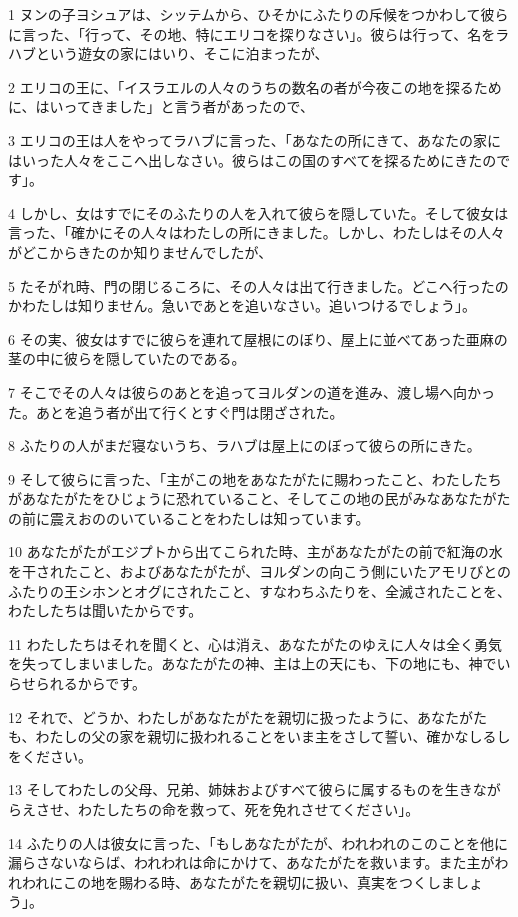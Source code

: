 \par 1 ヌンの子ヨシュアは、シッテムから、ひそかにふたりの斥候をつかわして彼らに言った、「行って、その地、特にエリコを探りなさい」。彼らは行って、名をラハブという遊女の家にはいり、そこに泊まったが、
\par 2 エリコの王に、「イスラエルの人々のうちの数名の者が今夜この地を探るために、はいってきました」と言う者があったので、
\par 3 エリコの王は人をやってラハブに言った、「あなたの所にきて、あなたの家にはいった人々をここへ出しなさい。彼らはこの国のすべてを探るためにきたのです」。
\par 4 しかし、女はすでにそのふたりの人を入れて彼らを隠していた。そして彼女は言った、「確かにその人々はわたしの所にきました。しかし、わたしはその人々がどこからきたのか知りませんでしたが、
\par 5 たそがれ時、門の閉じるころに、その人々は出て行きました。どこへ行ったのかわたしは知りません。急いであとを追いなさい。追いつけるでしょう」。
\par 6 その実、彼女はすでに彼らを連れて屋根にのぼり、屋上に並べてあった亜麻の茎の中に彼らを隠していたのである。
\par 7 そこでその人々は彼らのあとを追ってヨルダンの道を進み、渡し場へ向かった。あとを追う者が出て行くとすぐ門は閉ざされた。
\par 8 ふたりの人がまだ寝ないうち、ラハブは屋上にのぼって彼らの所にきた。
\par 9 そして彼らに言った、「主がこの地をあなたがたに賜わったこと、わたしたちがあなたがたをひじょうに恐れていること、そしてこの地の民がみなあなたがたの前に震えおののいていることをわたしは知っています。
\par 10 あなたがたがエジプトから出てこられた時、主があなたがたの前で紅海の水を干されたこと、およびあなたがたが、ヨルダンの向こう側にいたアモリびとのふたりの王シホンとオグにされたこと、すなわちふたりを、全滅されたことを、わたしたちは聞いたからです。
\par 11 わたしたちはそれを聞くと、心は消え、あなたがたのゆえに人々は全く勇気を失ってしまいました。あなたがたの神、主は上の天にも、下の地にも、神でいらせられるからです。
\par 12 それで、どうか、わたしがあなたがたを親切に扱ったように、あなたがたも、わたしの父の家を親切に扱われることをいま主をさして誓い、確かなしるしをください。
\par 13 そしてわたしの父母、兄弟、姉妹およびすべて彼らに属するものを生きながらえさせ、わたしたちの命を救って、死を免れさせてください」。
\par 14 ふたりの人は彼女に言った、「もしあなたがたが、われわれのこのことを他に漏らさないならば、われわれは命にかけて、あなたがたを救います。また主がわれわれにこの地を賜わる時、あなたがたを親切に扱い、真実をつくしましょう」。
